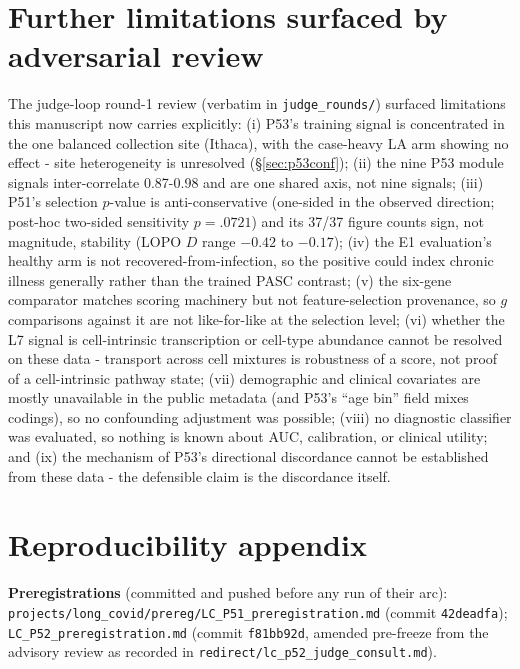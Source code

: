 \documentclass[11pt,a4paper]{article}
\begin{document}
\section{Further limitations surfaced by adversarial review}
The judge-loop round-1 review (verbatim in \texttt{judge\_rounds/}) surfaced
limitations this manuscript now carries explicitly: (i) P53's training signal
is concentrated in the one balanced collection site (Ithaca), with the
case-heavy LA arm showing no effect - site heterogeneity is unresolved
(\S\ref{sec:p53conf}); (ii) the nine P53 module signals inter-correlate
0.87-0.98 and are one shared axis, not nine signals; (iii) P51's selection
$p$-value is anti-conservative (one-sided in the observed direction;
post-hoc two-sided sensitivity $p=.0721$) and its 37/37 figure counts sign,
not magnitude, stability (LOPO $D$ range $-0.42$ to $-0.17$); (iv) the E1
evaluation's healthy arm is not recovered-from-infection, so the positive
could index chronic illness generally rather than the trained PASC contrast;
(v) the six-gene comparator matches scoring machinery but not
feature-selection provenance, so $g$ comparisons against it are not
like-for-like at the selection level; (vi) whether the L7 signal is
cell-intrinsic transcription or cell-type abundance cannot be resolved on
these data - transport across cell mixtures is robustness of a score, not
proof of a cell-intrinsic pathway state; (vii) demographic and clinical
covariates are mostly unavailable in the public metadata (and P53's ``age
bin'' field mixes codings), so no confounding adjustment was possible; (viii)
no diagnostic classifier was evaluated, so nothing is known about AUC,
calibration, or clinical utility; and (ix) the mechanism of P53's directional
discordance cannot be established from these data - the defensible claim is
the discordance itself.

\section{Reproducibility appendix}
\textbf{Preregistrations} (committed and pushed before any run of their arc):
\texttt{projects/long\_covid/prereg/LC\_P51\_preregistration.md} (commit
\texttt{42deadfa}); \texttt{LC\_P52\_preregistration.md} (commit
\texttt{f81bb92d}, amended pre-freeze from the advisory review as recorded in
\texttt{redirect/lc\_p52\_judge\_consult.md}).
\end{document}
